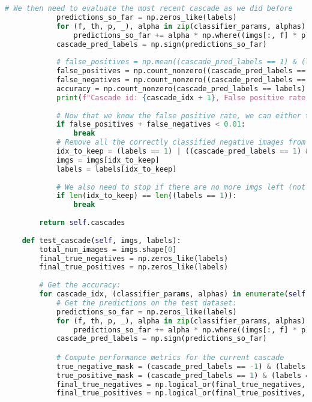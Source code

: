 \documentclass{article}
\begin{document}
\begin{lstlisting}[language=Python]
            # We then need to evaluate the most recent cascade as we did before
            predictions_so_far = np.zeros_like(labels)
            for (f, th, p, _), alpha in zip(classifier_params, alphas):
                predictions_so_far += alpha * np.where((imgs[:, f] * p) >= (th * p), 1, -1)
            cascade_pred_labels = np.sign(predictions_so_far)
            
            # false_positives = np.mean((cascade_pred_labels == 1) & (labels == -1))
            false_positives = np.count_nonzero((cascade_pred_labels == 1) & (labels == -1)) / len(cascade_pred_labels)
            false_negatives = np.count_nonzero((cascade_pred_labels == -1) & (labels == 1)) / len(cascade_pred_labels)
            accuracy = np.count_nonzero(cascade_pred_labels == labels) / len(cascade_pred_labels)
            print(f"Cascade id: {cascade_idx + 1}, False positive rate: {false_positives:.2f}, False negative rate: {false_negatives:.2f} Final Accuracy: {accuracy:.2f}")
            
            # Now that we know the false positive rate, we can either terminate, or keep going by removing correctly labeled negatives:
            if false_positives + false_negatives < 0.01:
                break
            # Remove all the correctly classified negative images from the dataset
            idx_to_keep = (labels == 1) | ((cascade_pred_labels == 1) & (labels == -1))
            imgs = imgs[idx_to_keep]
            labels = labels[idx_to_keep]
            
            # We also need to stop if there are no more imgs left (not removing any)
            if len(idx_to_keep) == len((labels == 1)):
                break
            
        return self.cascades
    
    def test_cascade(self, imgs, labels):
        total_num_images = imgs.shape[0]
        final_true_negatives = np.zeros_like(labels)
        final_true_positives = np.zeros_like(labels)
        
        # Get the accuracy:
        for cascade_idx, (classifier_params, alphas) in enumerate(self.cascades):
            # Get the predictions on the test dataset:
            predictions_so_far = np.zeros_like(labels)
            for (f, th, p, _), alpha in zip(classifier_params, alphas):
                predictions_so_far += alpha * np.where((imgs[:, f] * p) >= (th * p), 1, -1)
            cascade_pred_labels = np.sign(predictions_so_far)

            # Compute performance metrics for the current cascade
            true_negative_mask = (cascade_pred_labels == -1) & (labels == -1)
            true_positive_mask = (cascade_pred_labels == 1) & (labels == 1)
            final_true_negatives = np.logical_or(final_true_negatives, true_negative_mask)
            final_true_positives = np.logical_or(final_true_positives, true_positive_mask)
            

\end{lstlisting}
\end{document}
